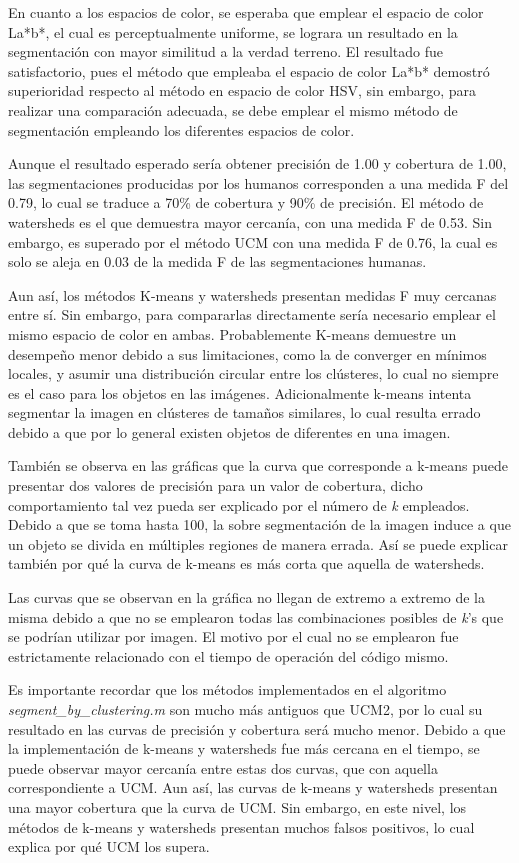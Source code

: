 \documentclass[10pt,twocolumn,letterpaper]{article}
\begin{document}
En cuanto a los espacios de color, se esperaba que emplear el espacio de color La*b*, el cual es perceptualmente uniforme, se lograra un resultado en la segmentación con mayor similitud a la verdad terreno. El resultado fue satisfactorio, pues el método que empleaba el espacio de color La*b* demostró superioridad respecto al método en espacio de color HSV, sin embargo, para realizar una comparación adecuada, se debe emplear el mismo método de segmentación empleando los diferentes espacios de color. 

Aunque el resultado esperado sería obtener precisión de 1.00 y cobertura de 1.00, las segmentaciones producidas por los humanos corresponden a una medida F del 0.79, lo cual se traduce a 70\% de cobertura y 90\% de precisión. El método de watersheds es el que demuestra mayor cercanía, con una medida F de 0.53. Sin embargo, es superado por el método UCM con una medida F de 0.76, la cual es solo se aleja en 0.03 de la medida F de las segmentaciones humanas.

Aun así, los métodos K-means y watersheds presentan medidas F muy cercanas entre sí. Sin embargo, para compararlas directamente sería necesario emplear el mismo espacio de color en ambas. Probablemente K-means demuestre un desempeño menor debido a sus limitaciones, como la de converger en mínimos locales, y asumir una distribución circular entre los clústeres, lo cual no siempre es el caso para los objetos en las imágenes. Adicionalmente k-means intenta segmentar la imagen en clústeres de tamaños similares, lo cual resulta errado debido a que por lo general existen objetos de diferentes en una imagen.

También se observa en las gráficas que la curva que corresponde a k-means puede presentar dos valores de precisión para un valor de cobertura, dicho comportamiento tal vez pueda ser explicado por el número de \textit{k} empleados. Debido a que se toma hasta 100, la sobre segmentación de la imagen induce a que un objeto se divida en múltiples regiones de manera errada. Así se puede explicar también por qué la curva de k-means es más corta que aquella de watersheds.

Las curvas que se observan en la gráfica no llegan de extremo a extremo de la misma debido a que no se emplearon todas las combinaciones posibles de \textit{k}'s que se podrían utilizar por imagen. El motivo por el cual no se emplearon fue estrictamente relacionado con el tiempo de operación del código mismo.

Es importante recordar que los métodos implementados en el algoritmo \textit{segment\_by\_clustering.m} son mucho más antiguos que UCM2, por lo cual su resultado en las curvas de precisión y cobertura será mucho menor. Debido a que la implementación de k-means y watersheds fue más cercana en el tiempo, se puede observar mayor cercanía entre estas dos curvas, que con aquella correspondiente a UCM. Aun así, las curvas de k-means y watersheds presentan una mayor cobertura que la curva de UCM. Sin embargo, en este nivel, los métodos de k-means y watersheds presentan muchos falsos positivos, lo cual explica por qué UCM los supera. 
\end{document}

